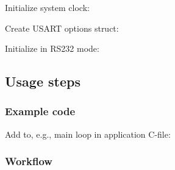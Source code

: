 \begin{DoxyEnumerate}
\item Initialize system clock\+:
\begin{DoxyItemize}
\item 
\begin{DoxyCode}{0}
\end{DoxyCode}

\end{DoxyItemize}
\item Create U\+S\+A\+RT options struct\+:
\begin{DoxyItemize}
\item 
\begin{DoxyCode}{0}
\DoxyCodeLine{\};}
\end{DoxyCode}

\end{DoxyItemize}
\item Initialize in R\+S232 mode\+:
\begin{DoxyItemize}
\item 
\begin{DoxyCode}{0}
\end{DoxyCode}

\end{DoxyItemize}
\end{DoxyEnumerate}\hypertarget{serial_use_case_1_serial_use_case_1_usage}{}\subsection{Usage steps}\label{serial_use_case_1_serial_use_case_1_usage}
\hypertarget{serial_use_case_1_serial_use_case_1_usage_code}{}\subsubsection{Example code}\label{serial_use_case_1_serial_use_case_1_usage_code}
Add to, e.\+g., main loop in application C-\/file\+: 
\begin{DoxyCode}{0}
\end{DoxyCode}
\hypertarget{serial_use_case_1_serial_use_case_1_usage_flow}{}\subsubsection{Workflow}\label{serial_use_case_1_serial_use_case_1_usage_flow}


